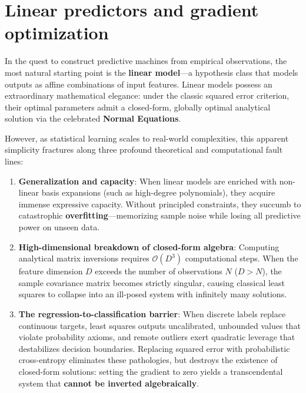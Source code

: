 \chapter{Linear predictors and gradient optimization}
\label{sec:linear_predictors_and_gradient_optimization}
\label{sec:optimization_and_gradient_descent}

In the quest to construct predictive machines from empirical observations, the most natural starting point is the \textbf{linear model}---a hypothesis class that models outputs as affine combinations of input features. Linear models possess an extraordinary mathematical elegance: under the classic squared error criterion, their optimal parameters admit a closed-form, globally optimal analytical solution via the celebrated \textbf{Normal Equations}. 

However, as statistical learning scales to real-world complexities, this apparent simplicity fractures along three profound theoretical and computational fault lines:
\begin{enumerate}[noitemsep,topsep=2pt,parsep=0pt,partopsep=0pt]
  \item \textbf{Generalization and capacity}: When linear models are enriched with non-linear basis expansions (such as high-degree polynomials), they acquire immense expressive capacity. Without principled constraints, they succumb to catastrophic \textbf{overfitting}---memorizing sample noise while losing all predictive power on unseen data.
  \item \textbf{High-dimensional breakdown of closed-form algebra}: Computing analytical matrix inversions requires $\mathcal{O}(D^3)$ computational steps. When the feature dimension $D$ exceeds the number of observations $N$ ($D > N$), the sample covariance matrix becomes strictly singular, causing classical least squares to collapse into an ill-posed system with infinitely many solutions.
  \item \textbf{The regression-to-classification barrier}: When discrete labels replace continuous targets, least squares outputs uncalibrated, unbounded values that violate probability axioms, and remote outliers exert quadratic leverage that destabilizes decision boundaries. Replacing squared error with probabilistic cross-entropy eliminates these pathologies, but destroys the existence of closed-form solutions: setting the gradient to zero yields a transcendental system that \textbf{cannot be inverted algebraically}.
\end{enumerate}

